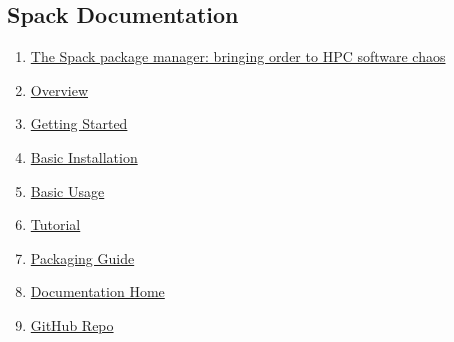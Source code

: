 \documentclass[10pt, oneside]{article}   	%
\begin{document}
\subsection{Spack Documentation}
\begin{enumerate}
	\item \href{https://dl-acm-org.libproxy.unm.edu/doi/10.1145/2807591.2807623}{The Spack package manager: bringing order to HPC software chaos}
	\item \href{https://computing.llnl.gov/projects/spack-hpc-package-manager}{Overview}
	\item \href{https://spack.readthedocs.io/en/latest/getting_started.html}{Getting Started}
	\item \href{https://spack-tutorial.readthedocs.io/en/latest/tutorial_basics.html}{Basic Installation}
	\item \href{https://spack.readthedocs.io/en/latest/basic_usage.html}{Basic Usage}
	\item \href{https://spack-tutorial.readthedocs.io/en/latest/}{Tutorial}
	\item \href{https://spack.readthedocs.io/en/latest/packaging_guide.html}{Packaging Guide}
	\item \href{https://spack.readthedocs.io/en/latest/}{Documentation Home}
	\item \href{https://github.com/spack/spacks}{GitHub Repo}
\end{enumerate}
\end{document}
